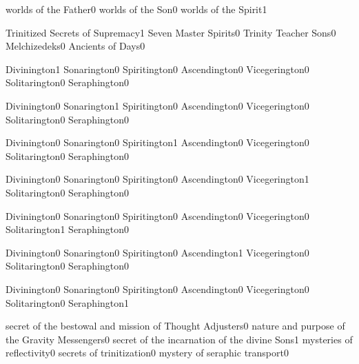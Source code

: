 {worlds of the Father}{0}
{worlds of the Son}{0}
{worlds of the Spirit}{1}
\qstop

{Trinitized Secrets of Supremacy}{1}
{Seven Master Spirits}{0}
{Trinity Teacher Sons}{0}
{Melchizedeks}{0}
{Ancients of Days}{0}
\qstop

{Divinington}{1}
{Sonarington}{0}
{Spiritington}{0}
{Ascendington}{0}
{Vicegerington}{0}
{Solitarington}{0}
{Seraphington}{0}
\qstop

{Divinington}{0}
{Sonarington}{1}
{Spiritington}{0}
{Ascendington}{0}
{Vicegerington}{0}
{Solitarington}{0}
{Seraphington}{0}
\qstop

{Divinington}{0}
{Sonarington}{0}
{Spiritington}{1}
{Ascendington}{0}
{Vicegerington}{0}
{Solitarington}{0}
{Seraphington}{0}
\qstop

{Divinington}{0}
{Sonarington}{0}
{Spiritington}{0}
{Ascendington}{0}
{Vicegerington}{1}
{Solitarington}{0}
{Seraphington}{0}
\qstop

{Divinington}{0}
{Sonarington}{0}
{Spiritington}{0}
{Ascendington}{0}
{Vicegerington}{0}
{Solitarington}{1}
{Seraphington}{0}
\qstop

{Divinington}{0}
{Sonarington}{0}
{Spiritington}{0}
{Ascendington}{1}
{Vicegerington}{0}
{Solitarington}{0}
{Seraphington}{0}
\qstop

{Divinington}{0}
{Sonarington}{0}
{Spiritington}{0}
{Ascendington}{0}
{Vicegerington}{0}
{Solitarington}{0}
{Seraphington}{1}
\qstop

{secret of the bestowal and mission of Thought Adjusters}{0}
{nature and purpose of the Gravity Messengers}{0}
{secret of the incarnation of the divine Sons}{1}
{mysteries of reflectivity}{0}
{secrets of trinitization}{0}
{mystery of seraphic transport}{0}
\qstop

